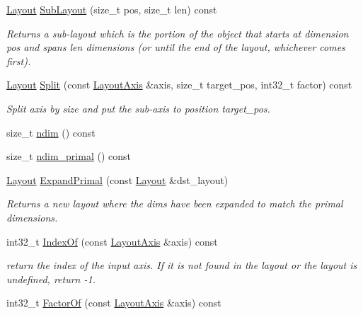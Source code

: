 \begin{DoxyCompactItemize}
\hyperlink{classtvm_1_1tir_1_1Layout}{Layout} \hyperlink{classtvm_1_1tir_1_1Layout_a506777d73f3b9e5ce24e4f4dfa4122b0}{Sub\+Layout} (size\+\_\+t pos, size\+\_\+t len) const 
\begin{DoxyCompactList}\small\item\em Returns a sub-\/layout which is the portion of the object that starts at dimension {\ttfamily pos} and spans {\ttfamily len} dimensions (or until the end of the layout, whichever comes first). \end{DoxyCompactList}\item 
\hyperlink{classtvm_1_1tir_1_1Layout}{Layout} \hyperlink{classtvm_1_1tir_1_1Layout_aba8612236310488f3a385bd8b139b914}{Split} (const \hyperlink{classtvm_1_1tir_1_1LayoutAxis}{Layout\+Axis} \&axis, size\+\_\+t target\+\_\+pos, int32\+\_\+t factor) const 
\begin{DoxyCompactList}\small\item\em Split {\ttfamily axis} by {\ttfamily size} and put the sub-\/axis to position {\ttfamily target\+\_\+pos}. \end{DoxyCompactList}\item 
size\+\_\+t \hyperlink{classtvm_1_1tir_1_1Layout_a4bca97ce52386c053a442ff960581f92}{ndim} () const 
\item 
size\+\_\+t \hyperlink{classtvm_1_1tir_1_1Layout_a2f983c2de370c89a9f0b12ebcf9fec0c}{ndim\+\_\+primal} () const 
\item 
\hyperlink{classtvm_1_1tir_1_1Layout}{Layout} \hyperlink{classtvm_1_1tir_1_1Layout_a88c306ea4682d28b85032277fa29df63}{Expand\+Primal} (const \hyperlink{classtvm_1_1tir_1_1Layout}{Layout} \&dst\+\_\+layout)
\begin{DoxyCompactList}\small\item\em Returns a new layout where the dims have been expanded to match the primal dimensions. \end{DoxyCompactList}\item 
int32\+\_\+t \hyperlink{classtvm_1_1tir_1_1Layout_a0fa224417a05bc774c6e4fc8093ca75a}{Index\+Of} (const \hyperlink{classtvm_1_1tir_1_1LayoutAxis}{Layout\+Axis} \&axis) const 
\begin{DoxyCompactList}\small\item\em return the index of the input axis. If it is not found in the layout or the layout is undefined, return -\/1. \end{DoxyCompactList}\item 
int32\+\_\+t \hyperlink{classtvm_1_1tir_1_1Layout_ad1e29ab749a79562fb2f746ccc42adf1}{Factor\+Of} (const \hyperlink{classtvm_1_1tir_1_1LayoutAxis}{Layout\+Axis} \&axis) const 

\end{DoxyCompactItemize}
